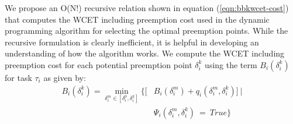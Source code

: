 \noindent
We propose an O(N!) recursive relation shown in equation (\ref{eqn:bbkwcet-cost}) that computes the WCET including preemption cost used in the dynamic programming algorithm for selecting the optimal preemption points. While the recursive formulation is clearly inefficient, it is helpful in developing an understanding of how the algorithm works. We compute the WCET including preemption cost for each potential preemption point \begin{math}\delta_{i}^{k}\end{math} using the term \begin{math}B_{i}(\delta_{i}^{k})\end{math} for task \begin{math}\tau_{i}\end{math} as given by:
\begin{equation}\label{eqn:bbkwcet-cost}
\begin{split}
   B_{i}(\delta_{i}^{k}) = \min_{\delta_{i}^{m} \in [\delta_{i}^{0},\delta_{i}^{k}]}
   \Big\{\Big[&B_{i}(\delta_{i}^{m}) + q_{i}(\delta_{i}^{m},\delta_{i}^{k})\Big]\ |\\
   &\Psi_{i}(\delta_{i}^{m},\delta_{i}^{k})\ =\ True\Big\}
\end{split}
\end{equation}
%
%
